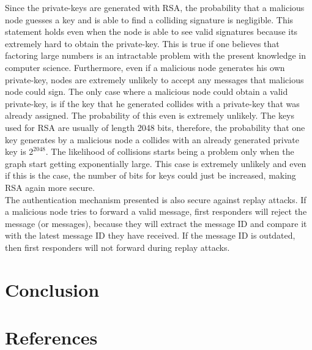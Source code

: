 \documentclass[letterpaper]{article}
\begin{document}
Since the private-keys are generated with RSA, the probability that a malicious node guesses a key and is able to find a colliding signature is negligible. This statement holds even when the node is able to see valid signatures because its extremely hard to obtain the private-key. This is true if one believes that factoring large numbers is an intractable problem with the present knowledge in computer science. Furthermore, even if a malicious node generates his own private-key, nodes are extremely unlikely to accept any messages that malicious node could sign. The only case where a malicious node could obtain a valid private-key, is if the key that he generated collides with a private-key that was already assigned. The probability of this even is extremely unlikely. The keys used for RSA are usually of length 2048 bits, therefore, the probability that one key generates by a malicious node a collides with an already generated private key is $2^{2048}$. The likelihood of collisions starts being a problem only when the graph start getting exponentially large. This case is extremely unlikely and even if this is the case, the number of bits for keys could just be increased, making RSA again more secure.\\

The authentication mechanism presented is also secure against replay attacks. If a malicious node tries to forward a valid message, first responders will reject the message (or messages), because they will extract the message ID and compare it with the latest message ID they have received. If the message ID is outdated, then first responders will not forward during replay attacks.

\section{Conclusion}

\section{References}
\end{document}

